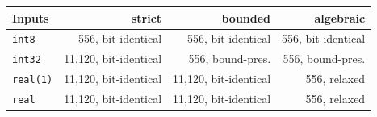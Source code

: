 \begin{tabular}{lrrr}
\toprule
Inputs & strict & bounded & algebraic\\
\midrule
\texttt{int8} & 556, bit-identical & 556, bit-identical & 556, bit-identical\\
\texttt{int32} & 11,120, bit-identical & 556, bound-pres. & 556, bound-pres.\\
\texttt{real(1)} & 11,120, bit-identical & 11,120, bit-identical & 556, relaxed\\
\texttt{real} & 11,120, bit-identical & 11,120, bit-identical & 556, relaxed\\
\bottomrule
\end{tabular}
